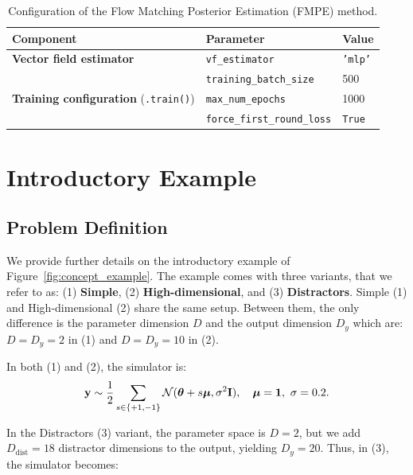 \begin{table}[h!]
\centering
\caption{Configuration of the Flow Matching Posterior Estimation (FMPE) method.}
\label{tab:fmpe_config}
\begin{tabular}{lll}
\toprule
\textbf{Component} & \textbf{Parameter} & \textbf{Value} \\
\midrule
\multirow{1}{*}{\textbf{Vector field estimator}}
 & \texttt{vf\_estimator} & \texttt{'mlp'} \\
\midrule
\multirow{3}{*}{\textbf{Training configuration} (\texttt{.train()})}
 & \texttt{training\_batch\_size} & 500 \\
 & \texttt{max\_num\_epochs} & 1000 \\
 & \texttt{force\_first\_round\_loss} & \texttt{True} \\
\bottomrule
\end{tabular}
\end{table}


\clearpage


  
\section{Introductory Example}
\label{app-sec:intro-example}

\subsection{Problem Definition}

We provide further details on the introductory example of Figure~\ref{fig:concept_example}.  
The example comes with three variants, that we refer to as: (1) \textbf{Simple}, (2) \textbf{High-dimensional}, and (3) \textbf{Distractors}.
%
Simple (1) and High-dimensional (2) share the same setup.
Between them, the only difference is the parameter dimension $D$ and the output dimension $D_y$ which are: $D=D_y=2$ in (1) and $D=D_y=10$ in (2).

In both (1) and (2), the simulator is:
\begin{equation}
  \label{eq:intro-simulator}
  \mathbf{y} \sim \frac{1}{2} \sum_{s \in \{+1, -1\}} \mathcal{N}(\boldsymbol{\theta} + s\boldsymbol{\mu}, \sigma^2 \mathbf{I}), 
  \quad \boldsymbol{\mu} = \mathbf{1}, \ \sigma = 0.2.
\end{equation}

In the Distractors (3) variant, the parameter space is $D = 2$, but we add $D_{\text{dist}} = 18$ distractor dimensions to the output, yielding $D_y = 20$.
Thus, in (3), the simulator becomes:

